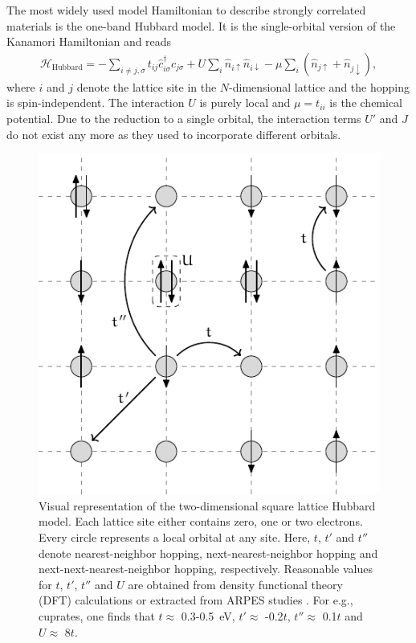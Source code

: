 \documentclass[../../main.tex]{subfiles}
\begin{document}
The most widely used model Hamiltonian to describe strongly correlated materials is the one-band Hubbard model. It is the single-orbital version of the Kanamori Hamiltonian and reads
\begin{align}\label{eq:one_band_hubbard_model}
	\mathcal{H}_{\text{Hubbard}}=-\sum_{i\neq j,\sigma}t_{ij}\hat c^{\dagger}_{i\sigma} \hat c_{j\sigma}+U\sum_{i}\hat n_{i\uparrow}\hat n_{i\downarrow}-\mu \sum_{i}(\hat n_{j\uparrow}+\hat n_{j\downarrow}),
\end{align}
where $i$ and $j$ denote the lattice site in the $N$-dimensional lattice and the hopping is spin-independent. The interaction $U$ is purely local and $\mu=t_{ii}$ is the chemical potential. Due to the reduction to a single orbital, the interaction terms $U'$ and $J$ do not exist any more as they used to incorporate different orbitals. 
\begin{figure}[ht!]
	\centering
	\includegraphics{Graphics/Diagrams/single_band_hubbard_model/single_band_hubbard_model.pdf}
	\caption{Visual representation of the two-dimensional square lattice Hubbard model. Each lattice site either contains zero, one or two electrons. Every circle represents a local orbital at any site. Here, $t$, $t'$ and $t''$ denote nearest-neighbor hopping, next-nearest-neighbor hopping and next-next-nearest-neighbor hopping, respectively. Reasonable values for $t$, $t'$, $t''$ and $U$ are obtained from density functional theory (DFT) calculations \cite{Pavarini2001} or extracted from ARPES studies \cite{Hashimoto2008}. For e.g., cuprates, one finds that $t\approx$ 0.3-0.5~eV, $t'\approx$ -0.2$t$, $t''\approx$ 0.1$t$ and $U\approx$ 8$t$.}
	\label{fig:hubbard_hopping}
\end{figure}
\end{document}
